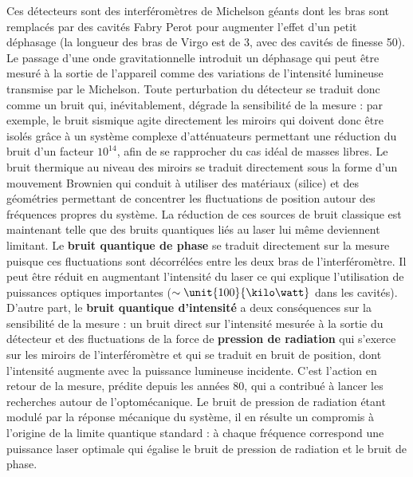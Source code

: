 \documentclass[12pt,a4paper]{article}
\begin{document}
Ces détecteurs sont des interféromètres de Michelson géants dont les bras sont remplacés par des cavités Fabry Perot pour augmenter l'effet d'un petit déphasage (la longueur des bras de Virgo est de \unit{3}{\kilo\meter}, avec des cavités de finesse 50).
Le passage d'une onde gravitationnelle introduit un déphasage qui peut être mesuré à la sortie de l'appareil comme des variations de l'intensité lumineuse transmise par le Michelson.
Toute perturbation du détecteur se traduit donc comme un bruit qui, inévitablement, dégrade la sensibilité de la mesure : par exemple, le bruit sismique agite directement les miroirs qui doivent donc être isolés grâce à un système complexe d'atténuateurs permettant une réduction du bruit d'un facteur $10^{14}$, afin de se rapprocher du cas idéal de masses libres.
Le bruit thermique au niveau des miroirs se traduit directement sous la forme d'un mouvement Brownien qui conduit à utiliser des matériaux (silice) et des géométries permettant de concentrer les fluctuations de position autour des fréquences propres du système.
La réduction de ces sources de bruit classique est maintenant telle que des bruits quantiques liés au laser lui même deviennent limitant.
Le \textbf{bruit quantique de phase} se traduit directement sur la mesure puisque ces fluctuations sont décorrélées entre les deux bras de l'interféromètre.
Il peut être réduit en augmentant l'intensité du laser ce qui explique l'utilisation de puissances optiques importantes ($\sim \unit{100}{\kilo\watt}$ dans les cavités).
D'autre part, le \textbf{bruit quantique d'intensité} a deux conséquences sur la sensibilité de la mesure : un bruit direct sur l'intensité mesurée à la sortie du détecteur et des fluctuations de la force de \textbf{pression de radiation} qui s'exerce sur les miroirs de l'interféromètre et qui se traduit en bruit de position, dont l'intensité augmente avec la puissance lumineuse incidente.
C'est l'action en retour de la mesure, prédite depuis les années 80, qui a contribué à lancer les recherches autour de l'optomécanique.
Le bruit de pression de radiation étant modulé par la réponse mécanique du système, il en résulte un compromis à l'origine de la limite quantique standard : à chaque fréquence correspond une puissance laser optimale qui égalise le bruit de pression de radiation et le bruit de phase.
\end{document}
